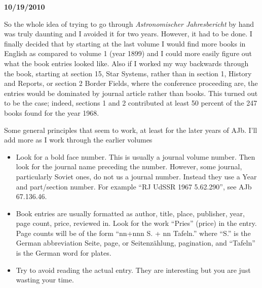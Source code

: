 
{\bf 10/19/2010}
 \cite{Wislicenus}

So the whole idea of trying to go through {\it Astronomischer
Jahresbericht} by hand was truly daunting and I avoided it for two
years.  However, it had to be done. I finally decided that by starting
at the last volume I would find more books in English as compared to
volume 1 (year 1899) and I could more easily figure out what the book
entries looked like.  Also if I worked my way backwards through the
book, starting at section 15, Star Systems, rather than in section 1,
History and Reports, or section 2 Border Fields, where the conference
proceeding are, the entries would be dominated by journal article
rather than books.  This turned out to be the case; indeed, sections 1
and 2 contributed at least 50 percent of the 247 books found for the year
1968.

Some general principles that seem to work, at least for the later
years of AJb. I'll add more as I work through the earlier volumes

\begin{itemize}

\item Look for a bold face number. This is usually a journal
volume number. Then look for the journal name preceding the
number. However, some journal, particularly Soviet ones, do not us a
journal number. Instead they use a Year and part/section number. For
example ``RJ UdSSR 1967 5.62.290'', see AJb 67.136.46.
\item Book entries are usually formatted as author, title, place, publisher,
year, page count, price, reviewed in.  Look for the work ``Pries''
(price) in the entry.  Page counts will be of the form ``nn+nnn S. +
nn Tafeln.''  where ``S.'' is the German abbreviation Seite, page, or
Seitenz\"{a}hlung, pagination, and ``Tafeln'' is the German word for
plates.
\item Try to avoid reading the actual entry.  They are interesting
but you are just wasting your time.
\end{itemize}

